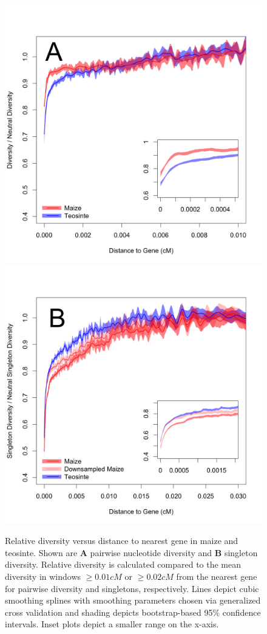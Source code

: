 \documentclass{pnastwo}
\begin{document}
\begin{article}
\begin{figure}[!tb]
\centering
\includegraphics[width=.45\textwidth]{FigsAndFiles/distanceToGene_WithSignificance_Folded2_manuscript.png} \includegraphics[width=.45\textwidth]{FigsAndFiles/distanceToGene_WithSignificance_Singletons_Downsampled_threeLines_manuscript.png}
\caption{Relative diversity versus distance to nearest gene in maize and teosinte. 
Shown are \textbf{A} pairwise nucleotide diversity and \textbf{B} singleton diversity.  
Relative diversity is calculated compared to the mean diversity in windows $\geq 0.01 cM$ or $\geq 0.02 cM$ from the nearest
gene for pairwise diversity and singletons, respectively. 
  Lines depict cubic smoothing splines with smoothing parameters chosen via generalized cross validation and shading depicts bootstrap-based 95\% confidence intervals.
  Inset plots depict a smaller range on the x-axis. \label{fig:purify}
  }
\end{figure}


\end{article}
\end{document}
